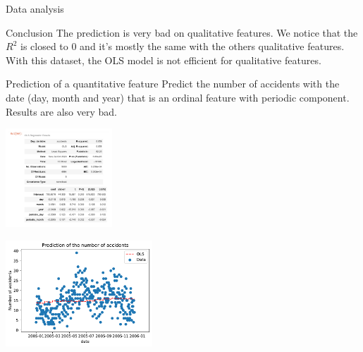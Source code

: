 \documentclass[unknownkeysallowed]{beamer}
\begin{document}
\begin{frame}{Data analysis}

\begin{block}{Conclusion}
The prediction is very bad on qualitative features. We notice that the $R^2$ is closed to 0 and it's mostly the same with the others qualitative features. With this dataset, the OLS model is not efficient for qualitative features.

\end{block}

\begin{block}{Prediction of a quantitative feature}
Predict the number of accidents with the date (day, month and year) that is an ordinal feature with periodic component. Results are also very bad.

\end{block}

\begin{minipage}[c]{.36\linewidth}
     \begin{center}
             \includegraphics[width=4cm]{stat_model_number1.pdf}
         \end{center}
   \end{minipage} \hfill
   \begin{minipage}[c]{.55\linewidth}
    \begin{center}
            \includegraphics[width=5.5cm]{accidentprediction.pdf}
            
        \end{center}
        
 \end{minipage}
    
\end{frame}
\end{document}
